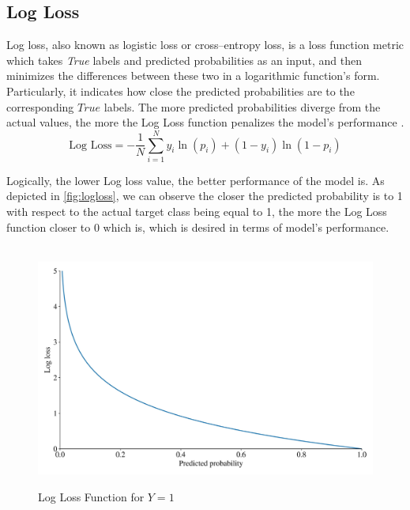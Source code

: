 \newpage
\subsection{Log Loss}
\label{subsubsec:logloss}

Log loss, also known as logistic loss or cross--entropy loss, is a loss function metric which takes \textit{True} labels and predicted probabilities as an input, and then minimizes the differences between these two in a logarithmic function's form.
Particularly, it indicates how close the predicted probabilities are to the corresponding $True$ labels. The more predicted probabilities diverge from the actual values, the more the Log Loss function penalizes the model's performance \citep{dembla2020intuition}.
\begin{equation}\label{eq}
    \text{Log Loss}  = -\frac{1}{N} \sum_{i=1}^{N} y_i \ln(p_i) + (1-y_i)\ln(1-p_i)
\end{equation}


Logically, the lower Log loss value, the better performance of the model is. As depicted in \autoref{fig:logloss}, we can observe the closer the predicted probability is to 1 with respect to the actual target class being equal to 1, the more the Log Loss function closer to 0 which is, which is desired in terms of model's performance.
\begin{figure}[H]
    \centering
    \caption{Log Loss Function for $Y=1$}\vspace{0.5em}
    \label{fig:logloss}\
    \includegraphics[width=130mm]{Figures/logloss.jpg}
    \vspace{-1em}
\end{figure}


